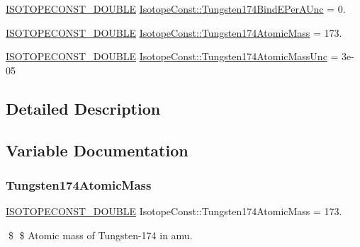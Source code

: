 \begin{DoxyCompactItemize}
\mbox{\hyperlink{group___isotope_const-_macros_ga8f45a7272ce02c0b4c65c44636ed719a}{I\+S\+O\+T\+O\+P\+E\+C\+O\+N\+S\+T\+\_\+\+D\+O\+U\+B\+LE}} \mbox{\hyperlink{group___isotope_const-_tungsten-_w174_ga3bdf0e6e66fc2b5237fecac10c411445}{Isotope\+Const\+::\+Tungsten174\+Bind\+E\+Per\+A\+Unc}} = 0.
\item 
\mbox{\hyperlink{group___isotope_const-_macros_ga8f45a7272ce02c0b4c65c44636ed719a}{I\+S\+O\+T\+O\+P\+E\+C\+O\+N\+S\+T\+\_\+\+D\+O\+U\+B\+LE}} \mbox{\hyperlink{group___isotope_const-_tungsten-_w174_gae7863dbd04e2a0c936176c7baddda062}{Isotope\+Const\+::\+Tungsten174\+Atomic\+Mass}} = 173.
\item 
\mbox{\hyperlink{group___isotope_const-_macros_ga8f45a7272ce02c0b4c65c44636ed719a}{I\+S\+O\+T\+O\+P\+E\+C\+O\+N\+S\+T\+\_\+\+D\+O\+U\+B\+LE}} \mbox{\hyperlink{group___isotope_const-_tungsten-_w174_gaf4ac77b53eed62aefbe493c6b1d1c2a6}{Isotope\+Const\+::\+Tungsten174\+Atomic\+Mass\+Unc}} = 3e-\/05
\end{DoxyCompactItemize}


\subsection{Detailed Description}


\subsection{Variable Documentation}
\mbox{\label{group___isotope_const-_tungsten-_w174_gae7863dbd04e2a0c936176c7baddda062}} 
\subsubsection{\texorpdfstring{Tungsten174\+Atomic\+Mass}{Tungsten174AtomicMass}}
{\footnotesize\ttfamily \mbox{\hyperlink{group___isotope_const-_macros_ga8f45a7272ce02c0b4c65c44636ed719a}{I\+S\+O\+T\+O\+P\+E\+C\+O\+N\+S\+T\+\_\+\+D\+O\+U\+B\+LE}} Isotope\+Const\+::\+Tungsten174\+Atomic\+Mass = 173.}

\$ \$ Atomic mass of Tungsten-\/174 in amu. \mbox{\label{group___isotope_const-_tungsten-_w174_gaf4ac77b53eed62aefbe493c6b1d1c2a6}} 
